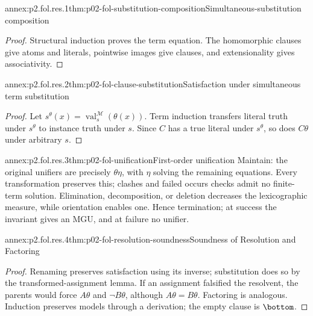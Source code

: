 
\begin{annexitem}{annex:p2.fol.res.1}{thm:p02-fol-substitution-composition}{Simultaneous-substitution composition}
\begin{proof}
Structural induction proves the term equation.  The homomorphic clauses give
atoms and literals, pointwise images give clauses, and extensionality gives
associativity.
\end{proof}
\end{annexitem}

\begin{annexitem}{annex:p2.fol.res.2}{thm:p02-fol-clause-substitution}{Satisfaction under simultaneous term substitution}
\begin{proof}
Let \(s^{\theta}(x)=\operatorname{val}^{\mathcal M}_{s}(\theta(x))\).
Term induction transfers literal truth under \(s^{\theta}\) to instance truth
under \(s\).  Since \(C\) has a true literal under \(s^{\theta}\), so does
\(C\theta\) under arbitrary \(s\).
\end{proof}
\end{annexitem}

\begin{annexitem}{annex:p2.fol.res.3}{thm:p02-fol-unification}{First-order unification}
Maintain: the original unifiers are precisely \(\theta\eta\), with \(\eta\)
solving the remaining equations.  Every transformation preserves this;
clashes and failed occurs checks admit no finite-term solution.  Elimination,
decomposition, or deletion decreases the lexicographic measure, while
orientation enables one.  Hence termination; at success the invariant gives
an MGU, and at failure no unifier.
\end{annexitem}

\begin{annexitem}{annex:p2.fol.res.4}{thm:p02-fol-resolution-soundness}{Soundness of Resolution and Factoring}
\begin{proof}
Renaming preserves satisfaction using its inverse; substitution does so by
the transformed-assignment lemma.  If an assignment falsified
the resolvent, the parents would force \(A\theta\) and \(\neg B\theta\),
although \(A\theta=B\theta\).  Factoring is analogous.  Induction preserves
models through a derivation; the empty clause is \(\bottom\).
\end{proof}
\end{annexitem}

